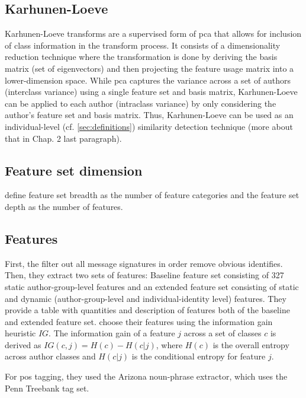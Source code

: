 \subsection{Karhunen-Loeve}
\label{sec:karhunen-loeve}

Karhunen-Loeve transforms are a supervised form of \ac{pca} that allows for inclusion of class information in the transform process.
It consists of a dimensionality reduction technique where the transformation is done by deriving the basis matrix (set of eigenvectors) and 
then projecting the feature usage matrix into a lower-dimension space.
While \ac{pca} captures the variance across a set of authors (interclass variance) using a single feature set and basis matrix, 
Karhunen-Loeve can be applied to each author (intraclass variance) by only considering the author's feature set and basis matrix.
Thus, Karhunen-Loeve can be used as an individual-level (cf. \autoref{sec:definitions}) similarity detection technique 
(more about that in \citep{abbasi_writeprints_2008} Chap. 2 last paragraph).


\subsection{Feature set dimension}
\label{sec:feature-set-dimension}

\citet{abbasi_writeprints_2008} define feature set breadth as the number of feature categories and 
the feature set depth as the number of features.

\subsection{Features}

First, the \citet{abbasi_writeprints_2008} filter out all message signatures in order remove obvious identifies.
Then, they extract two sets of features: Baseline feature set consisting of 327 static author-group-level features and an 
extended feature set consisting of static and dynamic (author-group-level and individual-identity level) features.
They provide a table with quantities and description of features both of the baseline and extended feature set.
\citet{abbasi_writeprints_2008} choose their features using the information gain heuristic $IG$.
The information gain of a feature $j$ across a set of classes $c$ is derived as $IG(c,j)=H(c)-H(c|j)$, 
where $H(c)$ is the overall entropy across author classes and $H(c|j)$ is the conditional entropy for feature $j$.

For \ac{pos} tagging, they used the Arizona noun-phrase extractor, which uses the Penn Treebank tag set.
